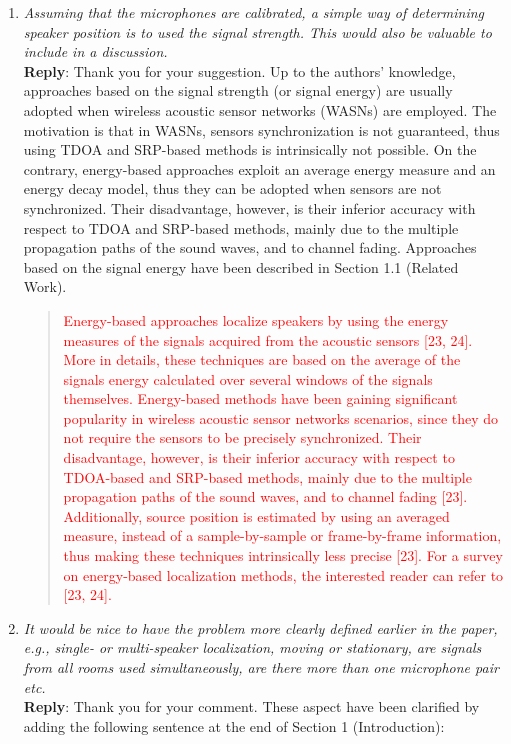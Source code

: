\documentclass[11pt, technote, letterpaper, oneside, onecolumn]{IEEEtran}
\begin{document}
\begin{enumerate}
\item \textit{Assuming that the microphones are calibrated, a simple way of determining speaker position is to used the signal strength. This would also be valuable to include in a discussion.\\}
\textbf{Reply}: Thank you for your suggestion. Up to the authors' knowledge, approaches based on the signal strength (or signal energy) are usually adopted when wireless acoustic sensor networks (WASNs) are employed. The motivation is that in WASNs, sensors synchronization is not guaranteed, thus using TDOA and SRP-based methods is intrinsically not possible. On the contrary, energy-based approaches exploit an average energy measure and an energy decay model, thus they can be adopted when sensors are not synchronized. Their disadvantage, however, is their inferior accuracy with respect to TDOA and SRP-based methods, mainly due to the multiple propagation paths of the sound waves, and to channel fading. Approaches based on the signal energy have been described in Section 1.1 (Related Work). 

\begin{quote}
\textcolor{red}{
Energy-based approaches localize speakers by using the energy measures of the signals acquired from the acoustic sensors [23, 24]. More in details, these techniques are based on the average of the signals energy calculated over several windows of the signals themselves. Energy-based methods have been gaining significant popularity in wireless acoustic sensor networks scenarios, since they do not require the sensors to be precisely synchronized. Their disadvantage, however, is their inferior accuracy with respect to TDOA-based and SRP-based methods, mainly due to the multiple propagation paths of the sound waves, and to channel fading [23]. Additionally, source position is estimated by using an averaged measure, instead of a sample-by-sample or frame-by-frame information, thus making these techniques intrinsically less precise [23]. For a survey on energy-based localization methods, the interested reader can refer to [23, 24].}
\end{quote}


\item \textit{It would be nice to have the problem more clearly defined earlier in the paper, e.g., single- or multi-speaker localization, moving or stationary, are signals from all rooms used simultaneously, are there more than one microphone pair etc.\\}
\textbf{Reply}: Thank you for your comment. These aspect have been clarified by adding the following sentence at the end of Section 1 (Introduction):


\end{enumerate}
\end{document}
